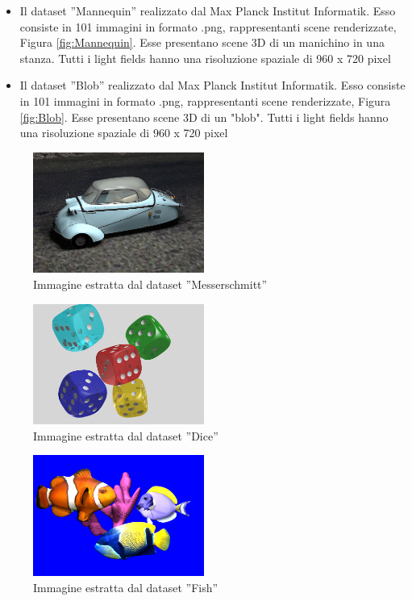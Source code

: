 \begin{itemize}
    \item  Il dataset ”Mannequin”\cite{Mannequin} realizzato dal Max Planck Institut Informatik. Esso consiste in 101 immagini in formato .png, rappresentanti scene renderizzate, Figura \ref{fig:Mannequin}. Esse presentano scene 3D di un manichino in una stanza. Tutti i light fields hanno una risoluzione spaziale di 960 x 720 pixel

    \item  Il dataset ”Blob”\cite{Blob} realizzato dal Max Planck Institut Informatik. Esso consiste in 101 immagini in formato .png, rappresentanti scene renderizzate, Figura \ref{fig:Blob}. Esse presentano scene 3D di un "blob". Tutti i light fields hanno una risoluzione spaziale di 960 x 720 pixel


\end{itemize}


\begin{figure}[ht]
    \centering
    \includegraphics[width=0.5\textwidth]{img/Messerschmitt.png}
    \caption{Immagine estratta dal dataset ”Messerschmitt”}
    \label{fig:Messerschmitt}
\end{figure}

\begin{figure}[ht]
    \centering
    \includegraphics[width=0.5\textwidth]{img/Dice.png}
    \caption{Immagine estratta dal dataset ”Dice”}
    \label{fig:Dice}
\end{figure}

\begin{figure}[ht]
    \centering
    \includegraphics[width=0.5\textwidth]{img/Fish.png}
    \caption{Immagine estratta dal dataset ”Fish”}
    \label{fig:Fish}
\end{figure}

